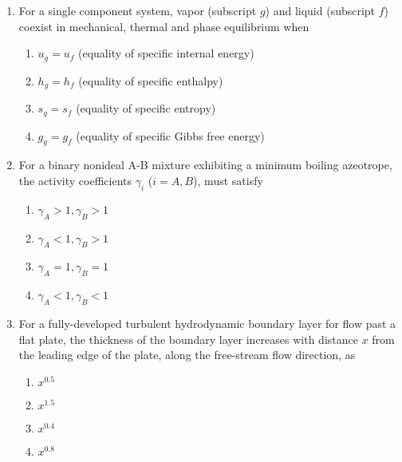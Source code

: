 \documentclass[12pt]{article}
\begin{document}
\begin{enumerate}[label=Q.\arabic*]
	\item For a single component system, vapor (subscript $g$) and liquid (subscript $f$) coexist in mechanical, thermal and phase equilibrium when
		\begin{multicols}{2}
			\begin{enumerate}[label=(\Alph*)]
				\item $u_g = u_f$ (equality of specific internal energy)
				\item $h_g = h_f$ (equality of specific enthalpy)
				\item $s_g = s_f$ (equality of specific entropy)
				\item $g_g = g_f$ (equality of specific Gibbs free energy)
			\end{enumerate}
		\end{multicols}

	\item For a binary nonideal A-B mixture exhibiting a minimum boiling azeotrope, the activity coefficients $\gamma_i$ ($i = A, B$), must satisfy
		\begin{multicols}{2}
			\begin{enumerate}[label=(\Alph*)]
				\item $\gamma_A > 1, \gamma_B > 1$
				\item $\gamma_A < 1, \gamma_B > 1$
				\item $\gamma_A = 1, \gamma_B = 1$
				\item $\gamma_A < 1, \gamma_B < 1$
			\end{enumerate}
		\end{multicols}

	\item For a fully-developed turbulent hydrodynamic boundary layer for flow past a flat plate, the thickness of the boundary layer increases with distance $x$ from the leading edge of the plate, along the free-stream flow direction, as
		\begin{multicols}{2}
			\begin{enumerate}[label=(\Alph*)]
				\item $x^{0.5}$
				\item $x^{1.5}$
				\item $x^{0.4}$
				\item $x^{0.8}$
			\end{enumerate}
		\end{multicols}


\end{enumerate}
\end{document}
